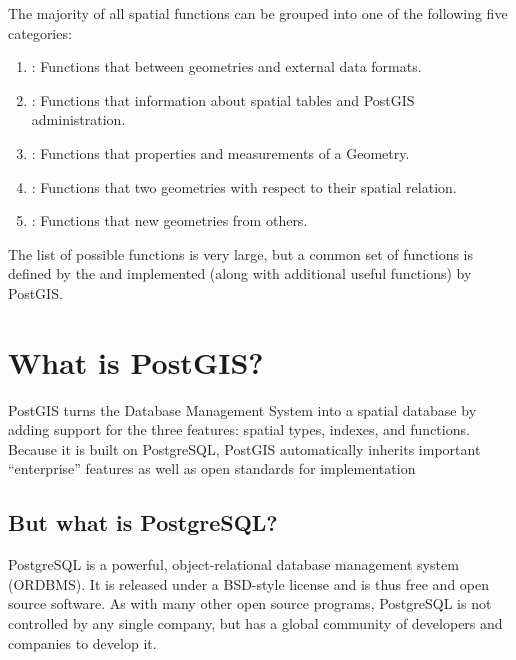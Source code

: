 \documentclass[a4paper,11pt,english]{sphinxmanual}
\begin{document}
The majority of all spatial functions can be grouped into one of the following five categories:
\begin{enumerate}
\def\theenumi{\arabic{enumi}}
\def\labelenumi{\theenumi .}
\makeatletter\def\p@enumii{\p@enumi \theenumi .}\makeatother
\item {} 
: Functions that  between geometries and external data formats.

\item {} 
: Functions that  information about spatial tables and PostGIS administration.

\item {} 
: Functions that  properties and measurements of a Geometry.

\item {} 
: Functions that  two geometries with respect to their spatial relation.

\item {} 
: Functions that  new geometries from others.

\end{enumerate}

The list of possible functions is very large, but a common set of functions is defined by the {\hyperref[\detokenize{glossary:term-ogc}]{}} {\hyperref[\detokenize{glossary:term-sfsql}]{}} and implemented (along with additional useful functions) by PostGIS.


\section{What is PostGIS?}
\label{\detokenize{introduction:what-is-postgis}}
PostGIS turns the  Database Management System into a spatial database by adding support for the three features: spatial types, indexes, and functions.  Because it is built on PostgreSQL, PostGIS automatically inherits important “enterprise” features as well as open standards for implementation


\subsection{But what is PostgreSQL?}
\label{\detokenize{introduction:but-what-is-postgresql}}
PostgreSQL is a powerful, object-relational database management system (ORDBMS). It is released under a BSD-style license and is thus free and open source software. As with many other open source programs, PostgreSQL is not controlled by any single company, but has a global community of developers and companies to develop it.
\end{document}
